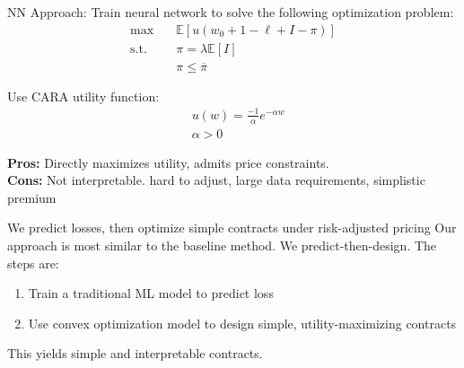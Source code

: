 \documentclass{beamer}
\begin{document}
\begin{frame}{NN Approach: \cite{chen2023managing}}
    Train neural network to solve the following optimization problem: 
    \begin{align*}
        \max &\quad \mathbb{E} \left [ u(w_0 + 1 - \ell + I -\pi) \right ]\\
        \text{s.t.} & \quad \pi = \lambda \mathbb{E}\left [ I \right ]\\
        & \quad \pi \leq \overline{\pi}
    \end{align*}

    Use CARA utility function:
    \begin{align*}
        & u(w) = \frac{-1}{\alpha} e^{-\alpha w}\\
        & \alpha > 0
    \end{align*}

    \textbf{Pros:} Directly maximizes utility, admits price constraints. \\
    \textbf{Cons:} Not interpretable. hard to adjust, large data requirements, simplistic premium
\end{frame}

    

   \begin{frame}{We predict losses, then optimize simple contracts under risk-adjusted pricing}
    Our approach is most similar to the baseline method. We predict-then-design. The steps are: 
    \vspace{5mm}
    
    \begin{enumerate}
        \item Train a traditional ML model to predict loss
        \item Use convex optimization model to design simple, utility-maximizing contracts
    \end{enumerate}
    
    \vspace{5mm}
    This yields simple and interpretable contracts. 
  \end{frame}
\end{document}
